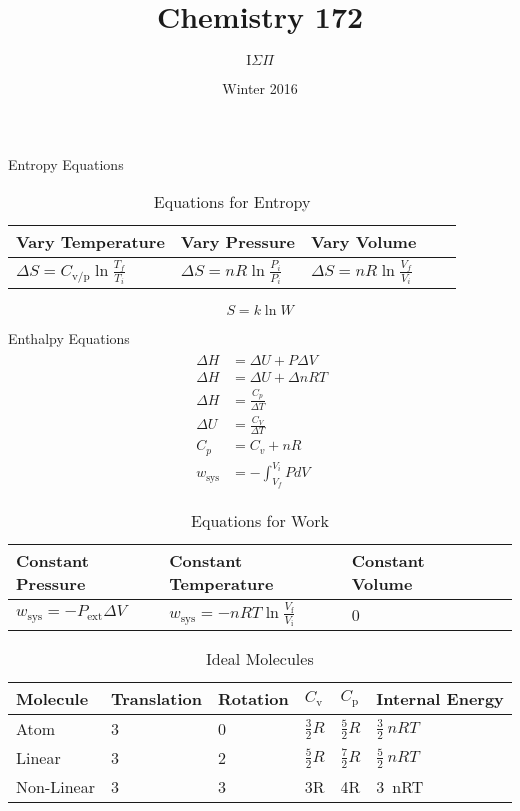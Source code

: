 \documentclass{article}
\title{Chemistry 172}
\author{$\text{I} \Sigma \Pi$}
\date{Winter 2016}
\begin{document}
\maketitle

Entropy Equations

\begin{table}[h]
\centering
\caption{Equations for Entropy}
\label{my-label}
\def\arraystretch{1.5}
\begin{tabular}{|l|l|l|l|l|}
\hline
Vary Temperature & Vary Pressure & Vary Volume   \\
\hline
$\Delta S = C_\text{v/p}\ln{\frac{T_f}{T_i}}$   & $\Delta S = nR\ln{\frac{P_i}{P_i}}$ & $\Delta S = nR\ln{\frac{V_f}{V_i}}$ \\
\hline
\end{tabular}
\end{table}

\begin{equation*}
S = k\ln{W}
\end{equation*}



Enthalpy Equations\\
\begin{align*}
\begin{split}
\
\Delta H &= \Delta U + P \Delta V \\ 
\
\Delta H &= \Delta U + \Delta n RT\\
\
\Delta H &= \frac{C_p}{\Delta T}\\
\
\Delta U &= \frac{C_V}{\Delta T}\\
\
C_p &= C_v + nR\\
\
w_\text{sys} & = - \int_{V_f}^{V_i} P dV
\end{split}
\end{align*}

\begin{table}[h]
\centering
\caption{Equations for Work}
\label{my-label}
\def\arraystretch{1.5}
\begin{tabular}{|l|l|l|l|l|}
\hline
Constant Pressure & Constant Temperature & Constant Volume   \\
\hline
$w_\text{sys} = - P_{\text{ext}} \Delta V$   & $w_\text{sys} = - n R T\ln{\frac{V_\text{f}}{V_\text{i}}}$ & 0 \\
\hline
\end{tabular}
\end{table}

\begin{table}[h]
\centering
\caption{Ideal Molecules}
\label{my-label}
\def\arraystretch{1.5}
\begin{tabular}{|l|l|l|l|l|l|}
\hline
Molecule & Translation & Rotation & $C_\text{v}$ & $C_\text{p}$ & Internal Energy  \\
\hline
Atom & 3 & 0 & $\frac{3}{2}R$ & $\frac{5}{2}R$ & $\frac{3}{2}\ nRT$\\
\hline
Linear & 3 & 2 & $\frac{5}{2}R$& $\frac{7}{2}R$ & $\frac{5}{2}\ nRT$\\
\hline
Non-Linear & 3 & 3 & 3R & 4R & 3\ nRT\\
\hline
\end{tabular}
\end{table}
\end{document}

